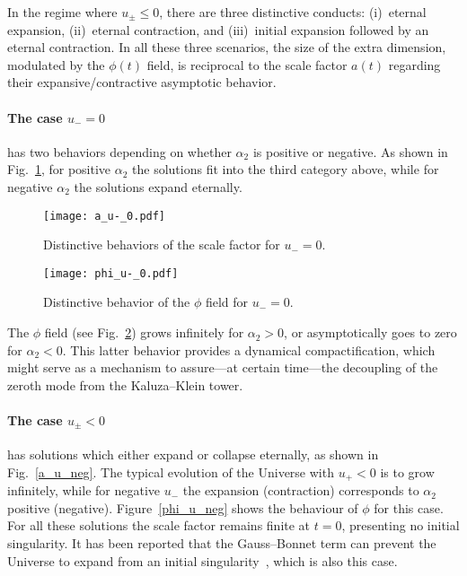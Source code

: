 \documentclass[aps,prd,12pt,superscriptaddress,showpacs,showkeys,longbibliography,reprint,nofootinbib]{revtex4-1}
\begin{document}
In the regime where $u_\pm \leq 0$, there are three distinctive conducts: (i)~eternal expansion, (ii)~eternal contraction, and (iii)~initial expansion followed by an eternal contraction. In all these three scenarios, the size of the extra dimension, modulated by the $\phi(t)$ field, is reciprocal to the scale factor $a(t)$ regarding their expansive/contractive asymptotic behavior.


\paragraph{The case $u_- = 0$} has two behaviors depending on whether $\alpha_2$ is positive or negative. As shown in Fig.~\ref{a_u_0}, for positive $\alpha_2$ the solutions fit into the third category above, while for negative $\alpha_2$ the solutions expand eternally. %
\begin{figure}[H]
  \texttt{[image: a\_u-\_0.pdf]} 
  \caption{Distinctive behaviors of the scale factor for $u_- = 0$.}
  \label{a_u_0}
\end{figure}
\begin{figure}[H]
  \texttt{[image: phi\_u-\_0.pdf]}
  \caption{Distinctive behavior of the $\phi$ field for $u_- = 0$.}
  \label{phi_u_0}
\end{figure}
The $\phi$ field (see Fig.~\ref{phi_u_0}) grows infinitely for $\alpha_2 > 0$, or asymptotically goes to zero for $\alpha_2 < 0$. This latter behavior provides a {dynamical} compactification, which might serve as a mechanism to assure---at certain time---the decoupling of the zeroth mode from the Kaluza--Klein tower.


\paragraph{The case $u_\pm < 0$} has solutions which either expand or collapse eternally, as shown in Fig.~\ref{a_u_neg}. The typical evolution of the Universe with $u_+ < 0$ is to grow infinitely, while for negative $u_-$ the expansion (contraction) corresponds to $\alpha_2$ positive (negative). Figure~\ref{phi_u_neg} shows the behaviour of $\phi$ for this case.%
For all these solutions the scale factor remains finite at $t = 0$, presenting no initial singularity. It has been reported that the Gauss--Bonnet term can prevent the Universe to expand from an initial singularity~\cite{Deruelle:1986iv,Henriques:1986jw,*Ishihara:1986if}, which is also this case.
\end{document}
